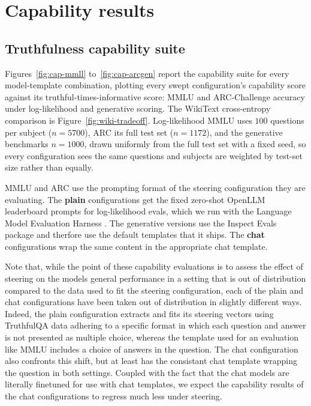 \documentclass[logo,msc,notimes]{infthesis}
\begin{document}
\chapter{Capability results}\label{app:capability}

\section{Truthfulness capability suite}\label{app:cap-suite}
Figures~\ref{fig:cap-mmll} to~\ref{fig:cap-arcgen} report the capability suite for every
model-template combination, plotting every swept configuration's capability score against its
truthful-times-informative score: MMLU and ARC-Challenge accuracy under log-likelihood and
generative scoring. The WikiText cross-entropy comparison is Figure~\ref{fig:wiki-tradeoff}.
Log-likelihood MMLU uses $100$ questions per
subject ($n{=}5700$), ARC its full test set ($n{=}1172$), and the generative benchmarks $n{=}1000$,
drawn uniformly from the full test set with a fixed seed, so every configuration sees the same
questions and subjects are weighted by test-set size rather than equally.

MMLU and ARC use the prompting format of the steering configuration they are evaluating. The \textbf{plain} configurations get the fixed zero-shot OpenLLM leaderboard prompts \citep{beeching2023openllm} for log-likelihood evals, which we run with the Language Model Evaluation Harness \citep{gao2024lmeval}. The generative versions use the Inspect Evals package \citep{aisi2024inspect} and therfore use the default templates that it ships. The \textbf{chat} configurations wrap the same content in the appropriate chat template. 

Note that, while the point of these capability evaluations is to assess the effect of steering on the models general performance in a setting that is out of distribution compared to the data used to fit the steering configuration, each of the plain and chat configurations have been taken out of distribution in slightly different ways. Indeed, the plain configuration extracts and fits its steering vectors using TruthfulQA data adhering to a specific format in which each question and answer is not presented as multiple choice, whereas the template used for an evaluation like MMLU includes a choice of answers in the question. The chat configuration also confronts this shift, but at least has the consistant chat template wrapping the question in both settings. Coupled with the fact that the chat models are literally finetuned for use with chat templates, we expect the capability results of the chat configurations to regress much less under steering. 
\end{document}
